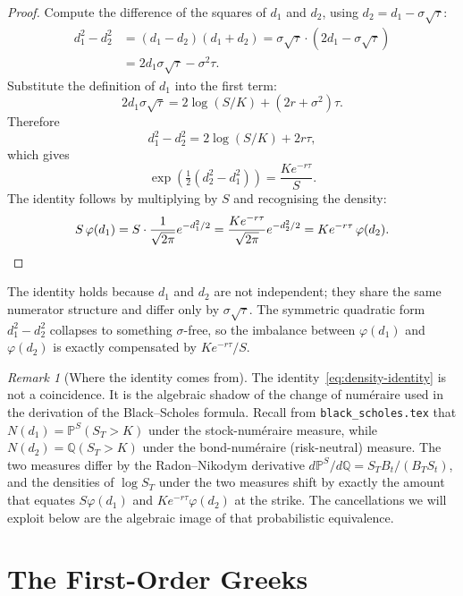 \documentclass[11pt,a4paper]{article}
\theoremstyle{plain}
\theoremstyle{definition}
\theoremstyle{remark}
\newtheorem{remark}[theorem]{Remark}
\newcommand{\Prob}{\mathbb{P}}
\newcommand{\Q}{\mathbb{Q}}
\begin{document}
\begin{proof}
Compute the difference of the squares of \(d_1\) and \(d_2\), using
\(d_2 = d_1 - \sigma\sqrt{\tau}\):
\begin{align*}
    d_1^2 - d_2^2
    &= (d_1 - d_2)(d_1 + d_2)
    = \sigma\sqrt{\tau} \cdot \left(2 d_1 - \sigma\sqrt{\tau}\right) \\
    &= 2 d_1 \sigma\sqrt{\tau} - \sigma^2 \tau.
\end{align*}
Substitute the definition of \(d_1\) into the first term:
\[
    2 d_1 \sigma\sqrt{\tau}
    = 2 \log(S/K) + (2r + \sigma^2)\tau.
\]
Therefore
\[
    d_1^2 - d_2^2
    = 2\log(S/K) + 2 r \tau,
\]
which gives
\[
    \exp\!\left(\tfrac{1}{2}(d_2^2 - d_1^2)\right)
    = \frac{K e^{-r\tau}}{S}.
\]
The identity follows by multiplying by \(S\) and recognising the
density:
\[
    S\, \varphi(d_1)
    = S \cdot \frac{1}{\sqrt{2\pi}} e^{-d_1^2/2}
    = \frac{K e^{-r\tau}}{\sqrt{2\pi}} e^{-d_2^2/2}
    = K e^{-r\tau}\, \varphi(d_2). \qedhere
\]
\end{proof}

The identity holds because \(d_1\) and \(d_2\) are not independent; they
share the same numerator structure and differ only by \(\sigma\sqrt{\tau}\).
The symmetric quadratic form \(d_1^2 - d_2^2\) collapses to something
\(\sigma\)-free, so the imbalance between \(\varphi(d_1)\) and
\(\varphi(d_2)\) is exactly compensated by \(K e^{-r\tau}/S\).

\begin{remark}[Where the identity comes from]
The identity~\eqref{eq:density-identity} is not a coincidence.
It is the algebraic shadow of the change of num\'{e}raire used in the
derivation of the Black--Scholes formula. Recall from
\texttt{black\_scholes.tex} that \(N(d_1) = \Prob^S(S_T > K)\) under
the stock-num\'{e}raire measure, while
\(N(d_2) = \Q(S_T > K)\) under the bond-num\'{e}raire (risk-neutral)
measure. The two measures differ by the Radon--Nikodym derivative
\(d\Prob^S / d\Q = S_T B_t / (B_T S_t)\), and the densities of \(\log
S_T\) under the two measures shift by exactly the amount that equates
\(S\varphi(d_1)\) and \(K e^{-r\tau}\varphi(d_2)\) at the strike.
The cancellations we will exploit below are the algebraic image of
that probabilistic equivalence.
\end{remark}

\section{The First-Order Greeks}
\end{document}
